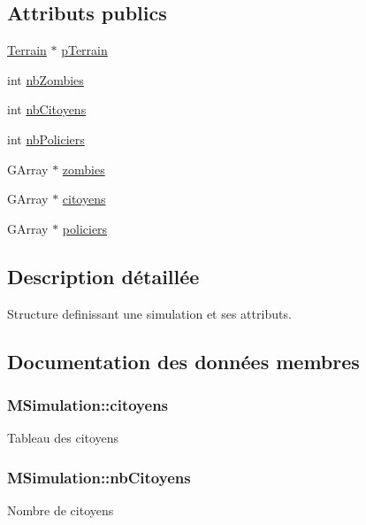 \subsection*{Attributs publics}
\begin{DoxyCompactItemize}
\item 
\hyperlink{terrain_8h_a11bbfdc6f8212f3246205cc0e7134136}{Terrain} $\ast$ \hyperlink{structMSimulation_aefc18c24eb2ab2f1224ff2063114122b}{p\+Terrain}
\item 
int \hyperlink{structMSimulation_a2be6307fb9eeb91c0292e363e61e0c1a}{nb\+Zombies}
\item 
int \hyperlink{structMSimulation_a9bbc6c7c49600206282cfa0e906bd502}{nb\+Citoyens}
\item 
int \hyperlink{structMSimulation_a36feaca3afcb2dca6023254639ce545c}{nb\+Policiers}
\item 
G\+Array $\ast$ \hyperlink{structMSimulation_ab18a020f5a29032678796540fdb981cc}{zombies}
\item 
G\+Array $\ast$ \hyperlink{structMSimulation_a3468065bed2a665bd316109c5a3b6480}{citoyens}
\item 
G\+Array $\ast$ \hyperlink{structMSimulation_a8281fb3df339f2006ce172e9de7d6910}{policiers}
\end{DoxyCompactItemize}


\subsection{Description détaillée}
Structure definissant une simulation et ses attributs. 

\subsection{Documentation des données membres}
\subsubsection[{\texorpdfstring{citoyens}{citoyens}}]{\setlength{\rightskip}{0pt plus 5cm}M\+Simulation\+::citoyens}\hypertarget{structMSimulation_a3468065bed2a665bd316109c5a3b6480}{}\label{structMSimulation_a3468065bed2a665bd316109c5a3b6480}
Tableau des citoyens 
\subsubsection[{\texorpdfstring{nb\+Citoyens}{nbCitoyens}}]{\setlength{\rightskip}{0pt plus 5cm}M\+Simulation\+::nb\+Citoyens}\hypertarget{structMSimulation_a9bbc6c7c49600206282cfa0e906bd502}{}\label{structMSimulation_a9bbc6c7c49600206282cfa0e906bd502}
Nombre de citoyens 
